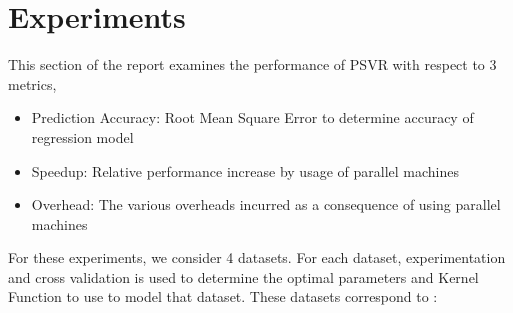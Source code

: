 \documentclass[12pt]{article}
\begin{document}
\section{Experiments}
This section of the report examines the performance of PSVR with respect to 3 metrics,
\begin{itemize}
\item  Prediction Accuracy: Root Mean Square Error to determine accuracy of regression model
\item Speedup: Relative performance increase by usage of parallel machines
\item Overhead: The various overheads incurred as a consequence of using parallel machines 
\end{itemize}
For these experiments, we consider 4 datasets. For each dataset, experimentation and cross validation is used to determine the optimal parameters and Kernel Function to use to model that dataset. These datasets correspond to : 
\end{document}
